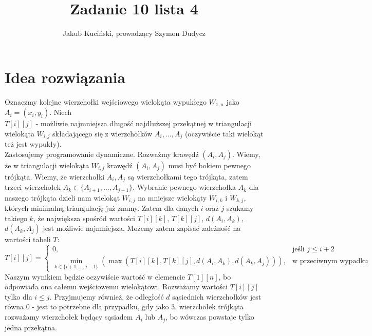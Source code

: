 \documentclass{article}
\title{Zadanie 10 lista 4}
\author{Jakub Kuciński, prowadzący Szymon Dudycz}
\begin{document}
\maketitle

\tableofcontents

\section{Idea rozwiązania}
Oznaczmy kolejne wierzchołki wejściowego wielokąta wypukłego $W_{1,n}$ jako $A_i = (x_i, y_i)$. Niech\\ 
$T[i][j]$ - możliwie najmniejsza długość najdłuższej przekątnej w triangulacji wielokąta $W_{i, j}$ składającego się z wierzchołków $A_i, \ldots, A_j$ (oczywiście taki wielokąt też jest wypukły).\\
Zastosujemy programowanie dynamiczne. Rozważmy krawędź $(A_i, A_j)$. Wiemy, że w triangulacji wielokąta $W_{i, j}$ krawędź $(A_i, A_j)$ musi być bokiem pewnego trójkąta. Wiemy, że wierzchołki $A_i, A_j$ są wierzchołkami tego trójkąta, zatem trzeci wierzchołek $A_k \in \{A_{i+1}, \ldots, A_{j-1}\}$. Wybranie pewnego wierzchołka $A_k$ dla naszego trójkąta dzieli nam wielokąt $W_{i, j}$ na mniejsze wielokąty $W_{i, k}$ i $W_{k, j}$, których minimalną triangulację już znamy. Zatem dla danych $i$ oraz $j$ szukamy takiego $k$, że największa spośród wartości $T[i][k]$, $T[k][j]$, $d(A_i, A_k)$, $d(A_k, A_j)$ jest możliwie najmniejsza. Możemy zatem zapisać zależność na wartości tabeli $T$:\\
$$
T[i][j] =
\begin{cases}
    0, \ & \text{jeśli } j\leq i+2 \\
    \displaystyle \min_{k\in \{i+1, \ldots, j-1\}} (\max(T[i][k], T[k][j], d(A_i, A_k), d(A_k, A_j))), & \text{w przeciwnym wypadku }
\end{cases}
$$
Naszym wynikiem będzie oczywiście wartość w elemencie $T[1][n]$, bo odpowiada ona całemu wejściowemu wielokątowi. Rozważamy wartości $T[i][j]$ tylko dla $i\leq j$. Przyjmujemy również, że odległość $d$ sąsiednich wierzchołków jest równa 0 - jest to potrzebne dla przypadku, gdy jako 3. wierzchołek trójkąta rozważamy wierzchołek będący sąsiadem $A_i$ lub $A_j$, bo wówczas powstaje tylko jedna przekątna.
\end{document}

